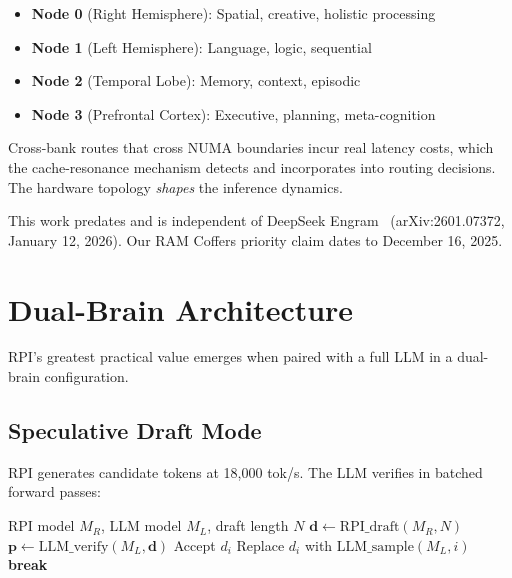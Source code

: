 \documentclass[10pt,twocolumn]{article}
\begin{document}
\begin{itemize}
\item \textbf{Node 0} (Right Hemisphere): Spatial, creative, holistic processing
\item \textbf{Node 1} (Left Hemisphere): Language, logic, sequential
\item \textbf{Node 2} (Temporal Lobe): Memory, context, episodic
\item \textbf{Node 3} (Prefrontal Cortex): Executive, planning, meta-cognition
\end{itemize}

Cross-bank routes that cross NUMA boundaries incur real latency costs, which the cache-resonance mechanism detects and incorporates into routing decisions. The hardware topology \emph{shapes} the inference dynamics.

This work predates and is independent of DeepSeek Engram~\cite{deepseek2026engram} (arXiv:2601.07372, January 12, 2026). Our RAM Coffers priority claim dates to December 16, 2025.

\section{Dual-Brain Architecture}
\label{sec:dual}

RPI's greatest practical value emerges when paired with a full LLM in a dual-brain configuration.

\subsection{Speculative Draft Mode}

RPI generates candidate tokens at 18,000 tok/s. The LLM verifies in batched forward passes:

\begin{algorithm}[h]
\caption{Dual-Brain Speculative Generation}
\label{alg:dual}
\begin{algorithmic}[1]
\REQUIRE RPI model $M_R$, LLM model $M_L$, draft length $N$
\STATE $\mathbf{d} \gets \text{RPI\_draft}(M_R, N)$ 
\STATE $\mathbf{p} \gets \text{LLM\_verify}(M_L, \mathbf{d})$ 
    \STATE Accept $d_i$
  \ELSE
    \STATE Replace $d_i$ with $\text{LLM\_sample}(M_L, i)$
    \STATE \textbf{break} 
  \ENDIF
\ENDFOR
\end{algorithmic}
\end{algorithm}
\end{document}
